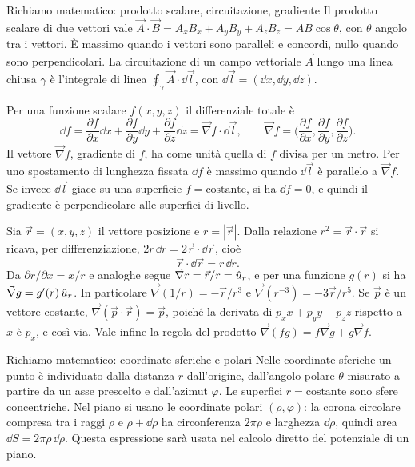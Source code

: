 \documentclass[11pt,a4paper]{article}
\begin{document}
\begin{riquadro}{Richiamo matematico: prodotto scalare, circuitazione, gradiente}
Il prodotto scalare di due vettori vale $\vec A\cdot\vec B=A_xB_x+A_yB_y+A_zB_z=AB\cos\theta$, con $\theta$ angolo tra i vettori. È massimo quando i vettori sono paralleli e concordi, nullo quando sono perpendicolari. La circuitazione di un campo vettoriale $\vec A$ lungo una linea chiusa $\gamma$ è l'integrale di linea $\oint_\gamma\vec A\cdot\dd\vec l$, con $\dd\vec l=(\dd x,\dd y,\dd z)$.

Per una funzione scalare $f(x,y,z)$ il differenziale totale è
\[
\dd f=\frac{\partial f}{\partial x}\dd x+\frac{\partial f}{\partial y}\dd y+\frac{\partial f}{\partial z}\dd z=\vec \nabla f\cdot\dd\vec l ,
\qquad
\vec \nabla f=\Big(\frac{\partial f}{\partial x},\frac{\partial f}{\partial y},\frac{\partial f}{\partial z}\Big).
\]
Il vettore $\vec \nabla f$, gradiente di $f$, ha come unità quella di $f$ divisa per un metro. Per uno spostamento di lunghezza fissata $\dd f$ è massimo quando $\dd\vec l$ è parallelo a $\vec \nabla f$. Se invece $\dd\vec l$ giace su una superficie $f=\text{costante}$, si ha $\dd f=0$, e quindi il gradiente è perpendicolare alle superfici di livello.

Sia $\vec r=(x,y,z)$ il vettore posizione e $r=|\vec r|$. Dalla relazione $r^2=\vec r\cdot\vec r$ si ricava, per differenziazione, $2r\,\dd r=2\vec r\cdot\dd\vec r$, cioè
\[
\vec r\cdot\dd\vec r=r\,\dd r .
\]
Da $\partial r/\partial x=x/r$ e analoghe segue $\vec \nabla r=\vec r/r=\hat{u}_r$, e per una funzione $g(r)$ si ha $\vec \nabla g=g'(r)\,\hat{u}_r$. In particolare $\vec \nabla(1/r)=-\vec r/r^3$ e $\vec \nabla(r^{-3})=-3\vec r/r^5$. Se $\vec p$ è un vettore costante, $\vec \nabla(\vec p\cdot\vec r)=\vec p$, poiché la derivata di $p_xx+p_yy+p_zz$ rispetto a $x$ è $p_x$, e così via. Vale infine la regola del prodotto $\vec \nabla(fg)=f\vec \nabla g+g\vec \nabla f$.
\end{riquadro}

\begin{riquadro}{Richiamo matematico: coordinate sferiche e polari}
Nelle coordinate sferiche un punto è individuato dalla distanza $r$ dall'origine, dall'angolo polare $\theta$ misurato a partire da un asse prescelto e dall'azimut $\varphi$. Le superfici $r=\text{costante}$ sono sfere concentriche. Nel piano si usano le coordinate polari $(\rho,\varphi)$: la corona circolare compresa tra i raggi $\rho$ e $\rho+\dd\rho$ ha circonferenza $2\pi\rho$ e larghezza $\dd\rho$, quindi area $\dd S=2\pi\rho\,\dd\rho$. Questa espressione sarà usata nel calcolo diretto del potenziale di un piano.
\end{riquadro}
\end{document}
